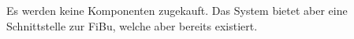 \documentclass[../../Pflichtenheft.tex]{subfiles}
\begin{document}
    Es werden keine Komponenten zugekauft. Das System bietet aber eine Schnittstelle zur FiBu, welche aber bereits existiert.
\end{document}
